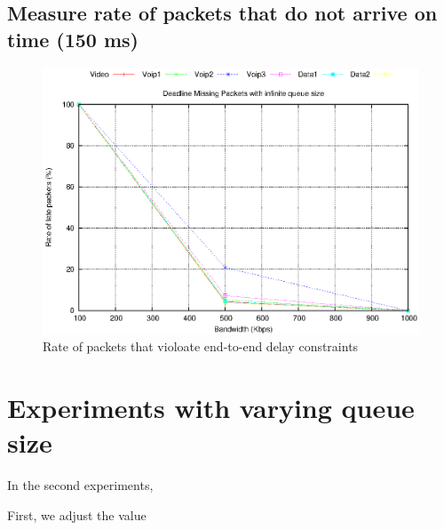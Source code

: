 \documentclass[letterpaper, 10 pt, conference]{ieeeconf}  %
\begin{document}
\subsection{\bf{Measure rate of packets that do not arrive on time (150 ms)}}
\label{sec:Laterate}
\noindent 

\begin{figure}[t]
\centering
\includegraphics{./graphs/deadlineEED.eps}
\caption{
Rate of packets that violoate end-to-end delay constraints
}
\label{fig:deadlineEED:}
\end{figure}

\section{Experiments with varying queue size}
\label{sec:exp2}
\noindent 
In the second experiments, 


First, we adjust the value 
\end{document}
